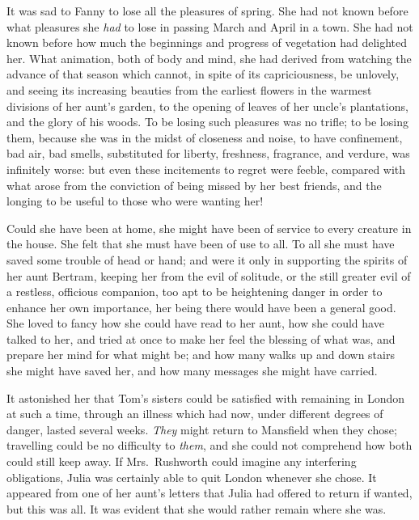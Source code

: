 \documentclass{article}
\begin{document}
It was sad to Fanny to lose all the pleasures of spring.
She had not known before what pleasures she \emph{had} to lose
in passing March and April in a town.  She had not known
before how much the beginnings and progress of vegetation
had delighted her.  What animation, both of body and mind,
she had derived from watching the advance of that season
which cannot, in spite of its capriciousness, be unlovely,
and seeing its increasing beauties from the earliest
flowers in the warmest divisions of her aunt's garden,
to the opening of leaves of her uncle's plantations,
and the glory of his woods.  To be losing such pleasures
was no trifle; to be losing them, because she was in
the midst of closeness and noise, to have confinement,
bad air, bad smells, substituted for liberty,
freshness, fragrance, and verdure, was infinitely worse:
but even these incitements to regret were feeble,
compared with what arose from the conviction of being
missed by her best friends, and the longing to be useful
to those who were wanting her!

Could she have been at home, she might have been of service
to every creature in the house.  She felt that she must
have been of use to all.  To all she must have saved some
trouble of head or hand; and were it only in supporting
the spirits of her aunt Bertram, keeping her from the evil
of solitude, or the still greater evil of a restless,
officious companion, too apt to be heightening danger
in order to enhance her own importance, her being there
would have been a general good.  She loved to fancy how she
could have read to her aunt, how she could have talked
to her, and tried at once to make her feel the blessing
of what was, and prepare her mind for what might be;
and how many walks up and down stairs she might have
saved her, and how many messages she might have carried.

It astonished her that Tom's sisters could be satisfied
with remaining in London at such a time, through an
illness which had now, under different degrees of danger,
lasted several weeks.  \emph{They} might return to Mansfield
when they chose; travelling could be no difficulty to \emph{them},
and she could not comprehend how both could still keep away.
If Mrs.\ Rushworth could imagine any interfering obligations,
Julia was certainly able to quit London whenever she chose.
It appeared from one of her aunt's letters that Julia
had offered to return if wanted, but this was all.
It was evident that she would rather remain where she was.
\end{document}
